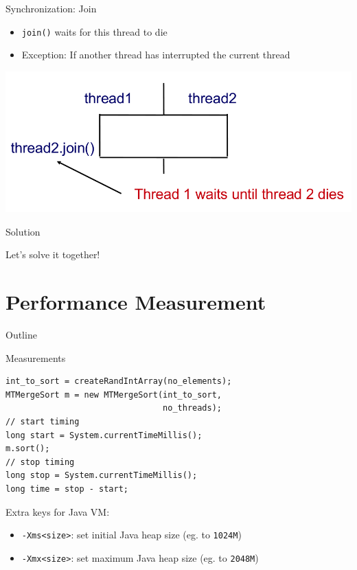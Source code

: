 \begin{frame}{Synchronization: Join}
  \begin{itemize}
  \item \lstinline!join()! waits for this thread to die
  \item Exception: If another thread has interrupted the current
    thread
  \end{itemize}


  \begin{center}
    \includegraphics[scale=0.4]{figures/join}
  \end{center}
\end{frame}

\begin{frame}{Solution}
  \begin{center}
    {\huge Let's solve it together!}
  \end{center}
\end{frame}


\section{Performance Measurement}

\begin{frame}{Outline}
  \tableofcontents[current]
\end{frame}

\begin{frame}[fragile]{Measurements}
\begin{lstlisting}
int_to_sort = createRandIntArray(no_elements);
MTMergeSort m = new MTMergeSort(int_to_sort, 
                                no_threads);
// start timing
long start = System.currentTimeMillis();
m.sort();
// stop timing
long stop = System.currentTimeMillis();
long time = stop - start;
\end{lstlisting}


  Extra keys for Java VM:

  \begin{itemize}
  \item \lstinline!-Xms<size>!: set initial Java heap size (eg. to
    \lstinline!1024M!)
  \item \lstinline!-Xmx<size>!: set maximum Java heap size (eg. to
    \lstinline!2048M!)
  \end{itemize}
\end{frame}

